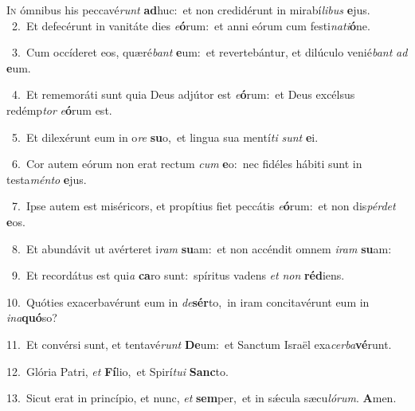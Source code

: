 \lettrine{\initial\textcolor{\initialcolor}{I}}{n} ómnibus his peccavé\textit{runt} \textbf{ad}\-huc:~\star et non credidérunt in mirabí\-\textit{li}\-\textit{bus} \textbf{e}\-jus.\\
{\numbfont\textcolor{\numbcolor}{~2.}}~Et defecérunt in vanitáte dies \textit{e}\-\textbf{ó}rum:~\star et anni eórum cum festi\-\textit{na}\-\textit{ti}\textbf{ó}ne.\par
{\numbfont\textcolor{\numbcolor}{~3.}}~Cum occíderet eos, quæré\textit{bant} \textbf{e}\-um:~\star et revertebántur, et dilúculo venié\textit{bant} \textit{ad} \textbf{e}\-um.\par
{\numbfont\textcolor{\numbcolor}{~4.}}~Et rememoráti sunt quia Deus adjútor est \textit{e}\-\textbf{ó}rum:~\star et Deus excélsus redémp\textit{tor} \textit{e}\-\textbf{ó}rum est.\par
{\numbfont\textcolor{\numbcolor}{~5.}}~Et dilexérunt eum in o\textit{re} \textbf{su}\-o,~\star et lingua sua mentí\textit{ti} \textit{sunt} \textbf{e}\-i.\par
{\numbfont\textcolor{\numbcolor}{~6.}}~Cor autem eórum non erat rectum \textit{cum} \textbf{e}\-o:~\star nec fidéles hábiti sunt in testa\-\textit{mén}\-\textit{to} \textbf{e}\-jus.\par
{\numbfont\textcolor{\numbcolor}{~7.}}~Ipse autem est miséricors, et propítius fiet peccátis \textit{e}\-\textbf{ó}rum:~\star et non dis\-\textit{pér}\-\textit{det} \textbf{e}\-os.\par
{\numbfont\textcolor{\numbcolor}{~8.}}~Et abundávit ut avérteret i\textit{ram} \textbf{su}\-am:~\star et non accéndit omnem \textit{i}\-\textit{ram} \textbf{su}\-am:\par
{\numbfont\textcolor{\numbcolor}{~9.}}~Et recordátus est qui\textit{a} \textbf{ca}\-ro sunt:~\star spíritus vadens \textit{et} \textit{non} \textbf{réd}\-iens.\par
{\numbfont\textcolor{\numbcolor}{10.}}~Quóties exacerbavérunt eum in \textit{de}\-\textbf{sér}to,~\star in iram concitavérunt eum in \textit{in}\-\textit{a}\textbf{quó}so?\par
{\numbfont\textcolor{\numbcolor}{11.}}~Et convérsi sunt, et tentavé\textit{runt} \textbf{De}\-um:~\star et Sanctum Israël exa\-\textit{cer}\-\textit{ba}\textbf{vé}runt.\par
{\numbfont\textcolor{\numbcolor}{12.}}~Glória Patri, \textit{et} \textbf{Fí}\-lio,~\star et Spirí\-\textit{tu}\-\textit{i} \textbf{Sanc}\-to.\par
{\numbfont\textcolor{\numbcolor}{13.}}~Sicut erat in princípio, et nunc, \textit{et} \textbf{sem}\-per,~\star et in sǽcula sæcu\-\textit{ló}\-\textit{rum}. \textbf{A}\-men.\par
